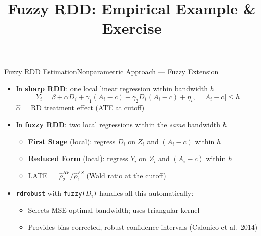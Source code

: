 \documentclass[hyperref={pdfpagelabels=false}]{beamer}
\begin{document}
\begin{frame}{Fuzzy RDD Estimation}{Nonparametric Approach --- Fuzzy Extension}
	\begin{itemize}
		\item In \textbf{sharp RDD}: one local linear regression within bandwidth $h$
		\begin{equation*}
			Y_i = \beta + \alpha D_i + \gamma_1(A_i-c) + \gamma_2 D_i(A_i-c) + \eta_i, \quad |A_i - c| \le h
		\end{equation*}
		$\hat{\alpha}$ = RD treatment effect (ATE at cutoff)
		\vspace{0.2cm}
		\item In \textbf{fuzzy RDD}: two local regressions within the \emph{same} bandwidth $h$
		\vspace{0.2cm}
		\begin{itemize}
			\item \textbf{First Stage} (local): regress $D_i$ on $Z_i$ and $(A_i - c)$ within $h$
			\vspace{0.2cm}
			\item \textbf{Reduced Form} (local): regress $Y_i$ on $Z_i$ and $(A_i - c)$ within $h$
			\vspace{0.2cm}
			\item LATE $= \hat{\rho}_2^{RF} / \hat{\rho}_1^{FS}$ (Wald ratio at the cutoff)
		\end{itemize}
		\vspace{0.2cm}
		\item \texttt{rdrobust} with \texttt{fuzzy($D_i$)} handles all this automatically:
		\vspace{0.2cm}
		\begin{itemize}
			\item Selects MSE-optimal bandwidth; uses triangular kernel
			\vspace{0.2cm}
			\item Provides bias-corrected, robust confidence intervals (Calonico et al.\ 2014)
		\end{itemize}
	\end{itemize}
\end{frame}


\title[]
{Fuzzy RDD: Empirical Example \& Exercise}

\author
{}

\institute{}

\date
{}

\begin{frame}{}
	\titlepage
\end{frame}
\end{document}
